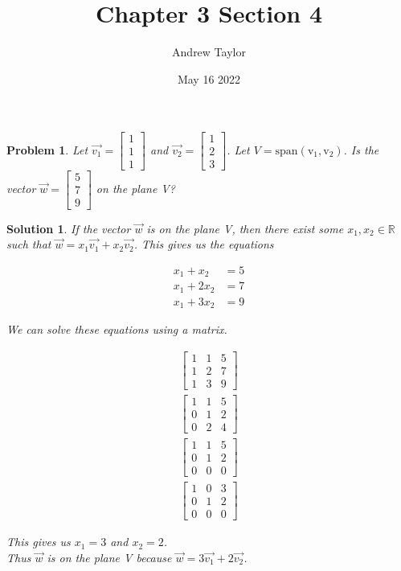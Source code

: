 \documentclass{article}
\title{Chapter 3 Section 4}
\author{Andrew Taylor}
\date{May 16 2022}
\newtheorem{problem}{Problem}
\newtheorem*{solution}{Solution}
\newcommand{\Span}[1]{\mathrm{span(#1)}}
\begin{document}
\maketitle

\begin{problem}
Let $\vec{v_{1}} = \begin{bmatrix} 1 \\ 1 \\ 1 \end{bmatrix}$ and $\vec{v_{2}} = \begin{bmatrix} 1 \\ 2 \\ 3 \end{bmatrix}$. Let $V = \Span{v_{1}, v_{2}}$. Is the vector $\vec{w} = \begin{bmatrix} 5 \\ 7 \\ 9 \end{bmatrix}$ on the plane V?
\end{problem}

\begin{solution}
If the vector $\vec{w}$ is on the plane V, then there exist some $x_{1}, x_{2} \in \mathbb{R}$ such that $\vec{w} = x_{1} \vec{v_{1}} + x_{2} \vec{v_{2}}$. This gives us the equations

\begin{align*}
x_{1} + x_{2} &= 5 \\
x_{1} + 2x_{2} &= 7 \\ 
x_{1} + 3x_{2} &= 9
\end{align*}

We can solve these equations using a matrix.

\begin{align*}
\left[ \begin{array}{cc|c}
1 & 1 & 5 \\
1 & 2 & 7 \\
1 & 3 & 9
\end{array} \right] \\
\left[ \begin{array}{cc|c}
1 & 1 & 5 \\
0 & 1 & 2 \\
0 & 2 & 4
\end{array} \right] \\
\left[ \begin{array}{cc|c}
1 & 1 & 5 \\
0 & 1 & 2 \\
0 & 0 & 0
\end{array} \right] \\
\left[ \begin{array}{cc|c}
1 & 0 & 3 \\
0 & 1 & 2 \\
0 & 0 & 0
\end{array} \right]
\end{align*}

This gives us $x_{1} = 3$ and $x_{2} = 2$. \\

Thus $\vec{w}$ is on the plane V because $\vec{w} = 3 \vec{v_{1}} + 2 \vec{v_{2}}$.

\end{solution}
\end{document}
